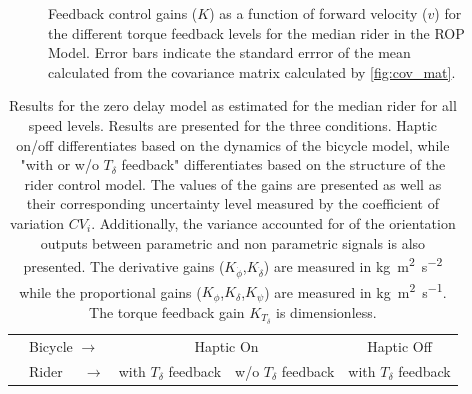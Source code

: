 \begin{figure}
\begin{subfigure}[b]{\textwidth}
            \caption{}            
            \label{fig:gains_speed3}
        \end{subfigure}
        \caption{Feedback control gains (\ensuremath{K}) as a function of forward velocity (\ensuremath{v}) for the different torque feedback levels for the median rider in the ROP Model. Error bars indicate the standard errror of the mean calculated from the covariance matrix calculated by \cref{fig:cov_mat}.}
        \label{fig:gains_speed}
     \end{figure}




\begin{table}[]
    \caption{ Results for the zero delay model as estimated for the median rider for all speed levels. Results are presented for the three conditions. Haptic on/off differentiates based on the dynamics of the bicycle model, while "with or w/o \ensuremath{T_\delta} feedback" differentiates based on the structure of the rider control model. The values of the gains are presented as well as their corresponding uncertainty level measured by the coefficient of variation \ensuremath{CV_i}. Additionally, the variance accounted for of the orientation outputs between parametric and non parametric signals is also presented. The derivative gains (\ensuremath{K_{\dot{\phi}}},\ensuremath{K_{\dot{\delta}}}) are measured in \si{\kilogram\square\meter\per\square\second} while the proportional gains (\ensuremath{K_{\phi}},\ensuremath{K_{\delta}},\ensuremath{K_{\psi}}) are measured in \si{\kilogram\square\meter\per\second}. The torque feedback gain \ensuremath{K_{T_\delta}} is dimensionless.}
    \label{tb:no_delay}
    \begin{tabular}{llcccccc}
    \hline
                                                   & Bicycle $\rightarrow$                                              & \multicolumn{4}{c}{Haptic On}                                                                                                                                                                         & \multicolumn{2}{c}{Haptic Off}                                                                    \\ \cline{2-8} 
                                                   & {\color[HTML]{333333} Rider $\;\;\;\;\rightarrow$} & \multicolumn{2}{l}{with $T_\delta$ feedback}                                                      & \multicolumn{2}{l}{w/o  $T_\delta$ feedback}                                                      & \multicolumn{2}{l}{with $T_\delta$ feedback}                                                      \\ \cline{2-8} 

\end{tabular}
\end{table}
